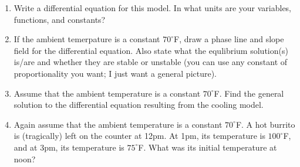 \documentclass[12pt]{article}
\begin{document}
\begin{enumerate}
\begin{enumerate}
 \item Write a differential equation for this model. In what units are your variables, functions, and constants?
\item If the ambient temerpature is a constant $70^\circ$F, draw a phase line and slope field for the differential equation. Also state what the equlibrium solution(s) is/are and whether they are stable or unstable (you can use any constant of proportionality you want; I just want a general picture).
 \item Assume that the ambient temperature is a constant $70^\circ$F. Find the general solution to the differential equation resulting from the cooling model.
 \item Again assume that the ambient temperature is a constant $70^\circ$F. A hot burrito is (tragically) left on the counter at 12pm. At 1pm, its temperature is $100^\circ$F,  and at 3pm, its temperature is $75^\circ$F. What was its initial temperature at noon?
  
 \end{enumerate}
 \end{enumerate}
\end{document}

